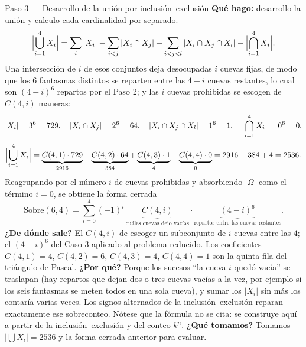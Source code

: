 \documentclass[11pt]{article}
\begin{document}
\begin{sol}
\begin{paso}{Paso 3 --- Desarrollo de la unión por inclusión--exclusión}
\textbf{Qué hago:} desarrollo la unión y calculo cada cardinalidad por separado.
\[
\Bigl|\bigcup_{i=1}^{4}X_i\Bigr|=\sum_i |X_i|-\sum_{i<j}|X_i\cap X_j|+\sum_{i<j<l}|X_i\cap X_j\cap X_l|-\Bigl|\bigcap_{i=1}^{4}X_i\Bigr| .
\]
Una intersección de $i$ de esos conjuntos deja desocupadas $i$ cuevas fijas, de modo que los $6$ fantasmas distintos se reparten entre las $4-i$ cuevas restantes, lo cual son $(4-i)^6$ repartos por el Paso 2; y las $i$ cuevas prohibidas se escogen de $C(4,i)$ maneras:
\[
|X_i|=3^6=729,\quad |X_i\cap X_j|=2^6=64,\quad |X_i\cap X_j\cap X_l|=1^6=1,\quad \Bigl|\bigcap_{i=1}^{4}X_i\Bigr|=0^6=0 .
\]
\[
\Bigl|\bigcup_{i=1}^{4}X_i\Bigr|=\underbrace{C(4,1)\cdot 729}_{2916}-\underbrace{C(4,2)\cdot 64}_{384}+\underbrace{C(4,3)\cdot 1}_{4}-\underbrace{C(4,4)\cdot 0}_{0}=2916-384+4=2536 .
\]
Reagrupando por el número $i$ de cuevas prohibidas y absorbiendo $|\Omega|$ como el término $i=0$, se obtiene la forma cerrada
\[
\text{Sobre}(6,4)=\sum_{i=0}^{4}(-1)^i\,\underbrace{C(4,i)}_{\text{cuáles cuevas dejo vacías}}\cdot\underbrace{(4-i)^{6}}_{\text{repartos entre las cuevas restantes}} .
\]
\textbf{¿De dónde sale?} El $C(4,i)$ de escoger un subconjunto de $i$ cuevas entre las $4$; el $(4-i)^6$ del Caso 3 aplicado al problema reducido. Los coeficientes $C(4,1)=4$, $C(4,2)=6$, $C(4,3)=4$, $C(4,4)=1$ son la quinta fila del triángulo de Pascal.
\textbf{¿Por qué?} Porque los sucesos ``la cueva $i$ quedó vacía'' se traslapan (hay repartos que dejan dos o tres cuevas vacías a la vez, por ejemplo si los seis fantasmas se meten todos en una sola cueva), y sumar los $|X_i|$ sin más los contaría varias veces. Los signos alternados de la inclusión--exclusión reparan exactamente ese sobreconteo. Nótese que la fórmula no se cita: se construye aquí a partir de la inclusión--exclusión y del conteo $k^n$.
\textbf{¿Qué tomamos?} Tomamos $\bigl|\bigcup X_i\bigr|=2536$ y la forma cerrada anterior para evaluar.
\end{paso}


\end{sol}
\end{document}
